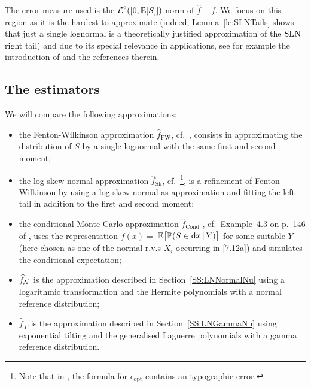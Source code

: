 The error measure used is the $\mathcal{L}^2([0, \operatorname{{\mathbb E}}[S]])$ norm of $\widehat{f}-f$. We focus on this region as
it is the hardest to approximate (indeed, Lemma~\ref{le:SLNTails} shows that just a single lognormal is a theoretically justified approximation of the $\mathrm{SLN}$ right tail) and due to its special relevance in applications, see for example the introduction of \cite {asmussen2015exponential} and the references therein.


\subsection{The estimators}
We will compare the following approximations:
\begin{itemize}
\item the Fenton-Wilkinson approximation $\widehat{f}_{\mathrm{FW}}$, cf.\ \cite{fenton1960sum}, consists in approximating the distribution of $S$ by a single lognormal
with the same first and second moment;
\item the log skew normal approximation $\widehat{f}_{\mathrm{Sk}}$,
cf.\ \cite{hcine2015highly}\footnote{Note that in \cite{hcine2015highly}, the formula for $\epsilon_{\mathrm{opt}}$ contains an typographic error.}, is a refinement of Fenton--Wilkinson by using a log  skew normal as approximation and fitting the left tail in addition to the first and second moment;
\item the conditional Monte Carlo approximation $\widehat{f}_{\mathrm{Cond}}$ , cf.\ Example~4.3 on p.\ 146 of \cite{asmussen2007stochastic}, uses the representation $f(x)=$
$\Exp\bigl[\mathbb{P}(S\in\dif x\,|\,Y)\bigr]$ for some suitable $Y$ (here chosen as one of the
normal r.v.s $X_i$ occurring in \eqref{7.12a}) and simulates the conditional expectation;
\item $\widehat{f}_{\mathcal{N}}$ is the approximation described in Section~\ref{SS:LNNormalNu} using a logarithmic transformation
and the Hermite polynomials with a normal reference distribution;
\item $\widehat{f}_{\,\Gamma}$ is the approximation described in Section~\ref{SS:LNGammaNu} using exponential tilting and the generalised Laguerre polynomials with a gamma reference distribution.
\end{itemize}

